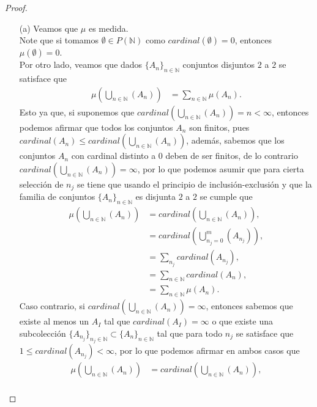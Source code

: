 \begin{enumerate}
\begin{proof} 
  \begin{enumerate}
    \item[(a)] Veamos que $\mu$ es medida.\\
      Note que si tomamos $\emptyset\in P(\mathbb{N})$ como $cardinal(\emptyset)=0$, entonces $\mu(\emptyset)=0$.\\
      Por otro lado, veamos que dados $\{A_{n}\}_{n\in\mathbb{N}}$ conjuntos disjuntos $2$ a $2$ se satisface que
      \begin{align*}
        \mu\left( \bigcup_{n\in\mathbb{N}}(A_{n}) \right)&=\sum_{n\in\mathbb{N}}\mu\left( A_{n} \right).
      \end{align*}
      Esto ya que, si suponemos que $cardinal\left( \bigcup_{n\in\mathbb{N}}(A_{n}) \right)=n<\infty$, entonces podemos afirmar que todos los conjuntos $A_{n}$ son finitos, pues $cardinal\left( A_{n} \right)\leq cardinal\left( \bigcup_{n\in\mathbb{N}}(A_{n}) \right)$, además, sabemos que los conjuntos $A_{n}$ con cardinal distinto a $0$ deben de ser finitos, de lo contrario $cardinal\left(\bigcup_{n\in\mathbb{N}}(A_{n})\right)=\infty$, por lo que podemos asumir que para cierta selección de $n_{j}$ se tiene que usando el principio de inclusión-exclusión y que la familia de conjuntos $\{A_{n}\}_{n\in\mathbb{N}}$ es disjunta $2$ a $2$ se cumple que
      \begin{align*}
        \mu\left( \bigcup_{n\in\mathbb{N}}(A_{n}) \right)&=cardinal\left(\bigcup_{n\in\mathbb{N}}(A_{n})\right),\\
        &=cardinal\left( \bigcup_{n_{j}=0}^{m}(A_{n_{j}}) \right),\\
        &=\sum_{n_{j}}cardinal\left( A_{n_{j}} \right),\\
        &=\sum_{n\in\mathbb{N}}cardinal\left( A_{n} \right),\\
        &=\sum_{n\in\mathbb{N}}\mu(A_{n}).
      \end{align*}
      Caso contrario, si $cardinal\left( \bigcup_{n\in\mathbb{N}}(A_{n}) \right)=\infty$, entonces sabemos que existe al menos un $A_{I}$ tal que $cardinal(A_I)=\infty$ o que existe una subcolección $\{A_{n_{j}}\}_{n_{j}\in\mathbb{N}}\subset \{A_{n}\}_{n\in\mathbb{N}}$ tal que para todo $n_{j}$ se satisface que $1  \leq cardinal\left( A_{n_{j}} \right)< \infty$, por lo que podemos afirmar en ambos casos que
      \begin{align*}
        \mu\left( \bigcup_{n\in\mathbb{N}}(A_{n}) \right)&=cardinal\left( \bigcup_{n\in\mathbb{N}}(A_{n}) \right),\\

\end{align*}
\end{enumerate}
\end{proof}
\end{enumerate}
